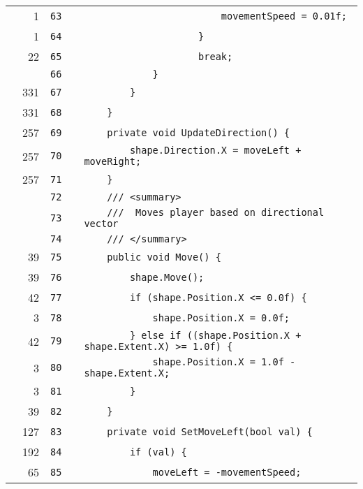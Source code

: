 \documentclass[a4paper,landscape,10pt]{article}
\begin{document}
\begin{longtable}[l]{lrrll}
\cellcolor{green} & 1 & \verb~63~ & & \verb~                        movementSpeed = 0.01f;~\\
\cellcolor{green} & 1 & \verb~64~ & & \verb~                    }~\\
\cellcolor{green} & 22 & \verb~65~ & & \verb~                    break;~\\
\cellcolor{gray} &  & \verb~66~ & & \verb~            }~\\
\cellcolor{green} & 331 & \verb~67~ & & \verb~        }~\\
\cellcolor{green} & 331 & \verb~68~ & & \verb~    }~\\
\cellcolor{green} & 257 & \verb~69~ & & \verb~    private void UpdateDirection() {~\\
\cellcolor{green} & 257 & \verb~70~ & & \verb~        shape.Direction.X = moveLeft + moveRight;~\\
\cellcolor{green} & 257 & \verb~71~ & & \verb~    }~\\
\cellcolor{gray} &  & \verb~72~ & & \verb~    /// <summary>~\\
\cellcolor{gray} &  & \verb~73~ & & \verb~    ///  Moves player based on directional vector~\\
\cellcolor{gray} &  & \verb~74~ & & \verb~    /// </summary>~\\
\cellcolor{green} & 39 & \verb~75~ & & \verb~    public void Move() {~\\
\cellcolor{green} & 39 & \verb~76~ & & \verb~        shape.Move();~\\
\cellcolor{green} & 42 & \verb~77~ & & \verb~        if (shape.Position.X <= 0.0f) {~\\
\cellcolor{green} & 3 & \verb~78~ & & \verb~            shape.Position.X = 0.0f;~\\
\cellcolor{green} & 42 & \verb~79~ & & \verb~        } else if ((shape.Position.X + shape.Extent.X) >= 1.0f) {~\\
\cellcolor{green} & 3 & \verb~80~ & & \verb~            shape.Position.X = 1.0f - shape.Extent.X;~\\
\cellcolor{green} & 3 & \verb~81~ & & \verb~        }~\\
\cellcolor{green} & 39 & \verb~82~ & & \verb~    }~\\
\cellcolor{green} & 127 & \verb~83~ & & \verb~    private void SetMoveLeft(bool val) {~\\
\cellcolor{green} & 192 & \verb~84~ & & \verb~        if (val) {~\\
\cellcolor{green} & 65 & \verb~85~ & & \verb~            moveLeft = -movementSpeed;~\\

\end{longtable}
\end{document}
